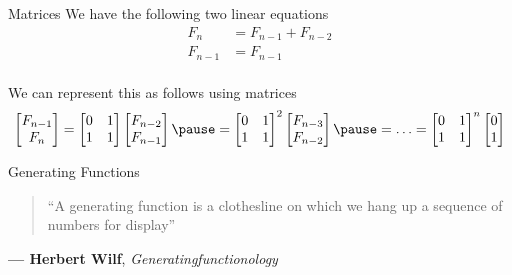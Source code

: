 \documentclass[aspectratio=169, handout]{beamer}
\begin{document}
\begin{frame}{Matrices}
    We have the following two linear equations
    \begin{align*}
        F_n &= F_{n - 1} + F_{n - 2} \\
        F_{n - 1} &= F_{n - 1} \\
    \end{align*}
    
    \pause
    
    We can represent this as follows using matrices
    $$\begin{bmatrix} F_{n - 1} \\ F_{n} \\ \end{bmatrix} = \begin{bmatrix} 0 & 1 \\ 1 & 1 \\ \end{bmatrix} \begin{bmatrix} F_{n - 2} \\ F_{n - 1} \\ \end{bmatrix} \pause = \begin{bmatrix} 0 & 1 \\ 1 & 1 \\ \end{bmatrix}^2 \begin{bmatrix} F_{n - 3} \\ F_{n - 2} \\ \end{bmatrix} \pause = \ldots = \begin{bmatrix} 0 & 1 \\ 1 & 1 \\ \end{bmatrix}^n \begin{bmatrix} 0 \\ 1 \\ \end{bmatrix}$$
    
\end{frame}

\begin{frame}{Generating Functions}
    \begin{quote}
        ``A generating function is a clothesline on which we hang up a sequence of numbers for display'' 
    \end{quote}
    \hfill\textbf{--- Herbert Wilf}, \emph{Generatingfunctionology} 
\end{frame}
\end{document}
